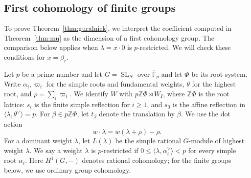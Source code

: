 \documentclass[11pt,a4paper,reqno]{amsart}
\numberwithin{equation}{section}
\theoremstyle{definition}
\newtheorem{example}[theorem]{Example}
\theoremstyle{remark}
\theoremstyle{plain}
\begin{document}


\subsection{First cohomology of finite groups}\label{sec:cohomology}
To prove Theorem~\ref{thm:guralnick}, we interpret the coefficient
computed in Theorem~\ref{thm:mu} as the dimension of a first
cohomology group. The comparison below applies when
$\lambda=x\cdot0$ is $p$-restricted. We will check
these conditions for $x=\beta_r$.

Let $p$ be a prime number and let $G=\operatorname{SL}_N$ over $\overline{\mathbb F}_p$ and let
$\Phi$ be its root system. Write $\alpha_i,\varpi_i$ for the simple
roots and fundamental weights, $\theta$ for the highest root, and
$\rho=\sum_i\varpi_i$. We identify $W$ with
$p\mathbb Z\Phi\rtimes W_I$, where $\mathbb Z\Phi$ is the root lattice: $s_i$ is the finite simple reflection for $i\geq1$, and $s_0$ is the affine reflection in $\langle\lambda,\theta^\vee\rangle=p$.
For $\beta\in p\mathbb Z\Phi$, let $t_\beta$ denote the translation by $\beta$.
We use the dot action
\[
 w\cdot\lambda=w(\lambda+\rho)-\rho.
\]
For a dominant weight $\lambda$, let $L(\lambda)$ be the simple
rational $G$-module of highest weight $\lambda$.
We say a weight $\lambda$ is
$p$-restricted if $0\leq\langle\lambda,\alpha_i^\vee\rangle<p$
for every simple root $\alpha_i$. Here $H^1(G,-)$ denotes rational
cohomology; for the finite groups below, we use ordinary group
cohomology.
\end{document}
